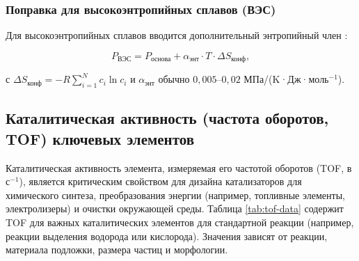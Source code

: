 \documentclass[12pt,a4paper]{article}
\begin{document}
	\subsubsection{Поправка для высокоэнтропийных сплавов (ВЭС)}
	
	Для высокоэнтропийных сплавов вводится дополнительный энтропийный член \cite{Wen2019, Yang2012}:
	
	\begin{equation}
		P_{\text{ВЭС}} = P_{\text{основа}} + \alpha_{\text{энт}} \cdot T \cdot \Delta S_{\text{конф}},
		\label{eq:hea}
	\end{equation}
	
	с \(\Delta S_{\text{конф}} = -R \sum_{i=1}^{N} c_i \ln c_i\) и \(\alpha_{\text{энт}}\) обычно \(0,005\)–\(0,02\) МПа/(K·Дж·моль\(^{-1}\)).
	
	\subsection{Каталитическая активность (частота оборотов, TOF) ключевых элементов}
	\label{subsec:catalytic-activity}
	
	Каталитическая активность элемента, измеряемая его частотой оборотов (TOF, в с\(^{-1}\)), является критическим свойством для дизайна катализаторов для химического синтеза, преобразования энергии (например, топливные элементы, электролизеры) и очистки окружающей среды. Таблица \ref{tab:tof-data} содержит TOF для важных каталитических элементов для стандартной реакции (например, реакции выделения водорода или кислорода). Значения зависят от реакции, материала подложки, размера частиц и морфологии.
	
\end{document}
